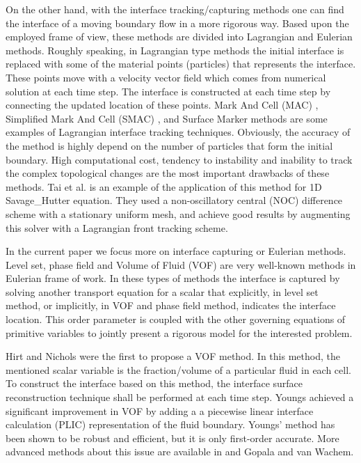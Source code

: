 \documentclass[letterpaper,10pt]{article}
\begin{document}
On the other hand, with the interface tracking/capturing methods one can find the interface of a moving boundary flow in a more rigorous way. Based upon the employed frame of view, these methods are divided into Lagrangian and Eulerian methods.
Roughly speaking, in Lagrangian type methods the initial interface is replaced with some of the material points (particles) that represents the interface. These points move with a velocity vector field which comes from numerical solution at each time step. The interface is constructed at each time step by connecting the updated location of these points. 
Mark And Cell (MAC) \cite{Harlow1965}, Simplified Mark And Cell (SMAC)  \cite{Cheng1995}, and Surface Marker \citep{Wrobel1991} methods are some examples of Lagrangian interface tracking techniques.
Obviously, the accuracy of the method is highly depend on the number 
of particles that form the initial boundary. 
High computational cost, tendency to instability and inability to track the complex topological changes are the most important drawbacks of these methods. 
Tai et al. \cite{Tai2002} is an example of the application of this method for 1D Savage\_Hutter equation. They used a non-oscillatory central (NOC) difference scheme with a stationary uniform mesh, and achieve good results by augmenting this solver with a Lagrangian front tracking scheme.\newline

In the current paper we focus more on interface capturing or Eulerian methods. Level set, phase field and Volume of Fluid (VOF) are very well-known methods in Eulerian frame of work.
In these types of methods the interface is captured by solving another transport equation for a scalar that explicitly, in level set method, or implicitly, in VOF and phase field method, indicates the interface location.
This order parameter is coupled with the other governing equations of primitive variables to jointly present a rigorous model for the interested problem.\newline



Hirt and Nichols \cite{hirt1981vfv} were the first to propose a VOF method. 
In this method, the mentioned scalar variable is the fraction/volume of a particular fluid in each cell.
To construct the interface based on this method, the interface surface reconstruction technique shall be performed at each time step. Youngs \cite{youngs1982tdm} achieved a significant improvement in VOF by adding a 
a piecewise linear interface calculation (PLIC) representation of the fluid boundary.  
Youngs' method has been shown to be robust and efficient, but it is only first-order accurate. More advanced methods about this issue are available in \cite{gerlach2006cvf} and Gopala and van Wachem\cite{gopala2008vfm}. 
\end{document}
